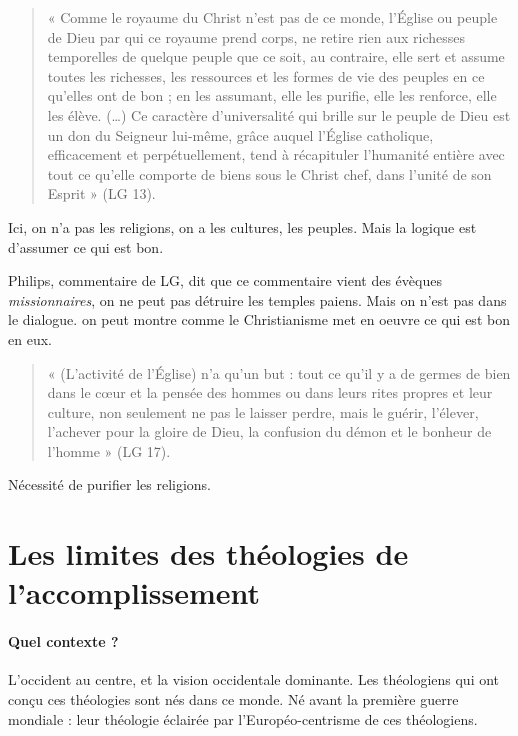 \begin{quote}
    «  Comme  le  royaume  du  Christ  n’est  pas  de  ce  monde,  l’Église  ou  peuple  de  Dieu  par  qui  ce  royaume prend  corps,    ne  retire  rien  aux  richesses  temporelles  de  quelque  peuple  que  ce  soit,  au  contraire,  elle sert  et  assume  toutes  les  richesses,  les  ressources  et  les  formes  de  vie  des  peuples  en  ce  qu’elles  ont  de bon  ;  en  les  assumant,  elle  les  purifie,  elle  les  renforce,  elle  les  élève.  (…)  Ce  caractère  d’universalité qui  brille  sur  le  peuple  de  Dieu  est  un  don  du  Seigneur  lui-même,  grâce  auquel  l’Église  catholique, efficacement  et  perpétuellement,  tend  à  récapituler  l’humanité  entière  avec  tout  ce  qu’elle  comporte  de biens  sous  le  Christ  chef, dans  l’unité  de  son  Esprit  »  (LG  13). 
\end{quote} 

Ici, on n'a pas les religions, on a les cultures, les peuples. Mais la logique est d'assumer ce qui est bon.


Philips, commentaire de LG, dit que ce commentaire vient des évèques \textit{missionnaires}, on ne peut pas détruire les temples paiens. Mais on n'est pas dans le dialogue. on peut montre comme le Christianisme met en oeuvre ce qui est bon en eux.


\begin{quote}
    «  (L’activité  de  l’Église)  n’a  qu’un  but  :  tout  ce  qu’il  y  a  de  germes  de  bien  dans  le  cœur  et  la  pensée des  hommes  ou  dans  leurs  rites  propres  et  leur  culture,  non  seulement  ne  pas  le  laisser  perdre,  mais  le guérir,  l’élever,  l’achever  pour  la  gloire  de  Dieu,  la  confusion  du  démon  et  le  bonheur  de  l’homme  » (LG  17). 
\end{quote}
Nécessité de purifier les religions.


  \section{Les limites des théologies de
  l'accomplissement}

\paragraph{Quel contexte ?} L'occident au centre, et la vision occidentale dominante. Les théologiens qui ont conçu ces théologies sont nés dans ce monde. Né avant la première guerre mondiale : leur théologie éclairée par l'Européo-centrisme de ces théologiens. 



